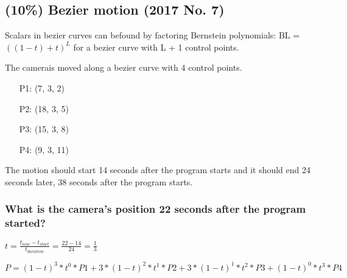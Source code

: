 \subsection{(10\%) Bezier motion (2017 No. 7)}
Scalars in bezier curves can befound by factoring Bernstein polynomials: BL = $((1-t) + t)^L$ for a bezier curve with L + 1 control points.

The camerais moved along a bezier curve with 4 control points.
\begin{itemize}
    \item[P1:] (7, 3, 2)
    \item[P2:] (18, 3, 5)
    \item[P3:] (15, 3, 8)
    \item[P4:] (9, 3, 11)
\end{itemize}

The motion should start 14 seconds after the program starts and it should end 24 seconds later, 38 seconds after the program starts.

\subsubsection{What is the camera's position 22 seconds after the program started?}


$
    t
=
    \frac{t_{now} - t_{start}}{t_{duration}}
=
    \frac{22 - 14}{24}
=
    \frac{1}{3}
$

$
    P
=
        (1-t)^3 * t^0 * P1 +
    3 * (1-t)^2 * t^1 * P2 +
    3 * (1-t)^1 * t^2 * P3 +
        (1-t)^0 * t^3 * P4
$

